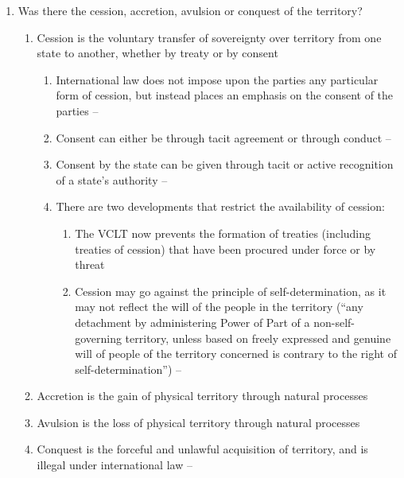\begin{enumerate}
\begin{enumerate}
\begin{enumerate}
        \end{enumerate}
    \end{enumerate}
    \item Was there the cession, accretion, avulsion or conquest of the territory?
    \begin{enumerate}
        \item Cession is the voluntary transfer of sovereignty over territory from one state to another, whether by treaty or by consent
        \begin{enumerate}
            \item International law does not impose upon the parties any particular form of cession, but instead places an emphasis on the consent of the parties -- 
            \item Consent can either be through tacit agreement or through conduct -- 
            \item Consent by the state can be given through tacit or active recognition of a state's authority -- 
            \item There are two developments that restrict the availability of cession:
            \begin{enumerate}
                \item The VCLT now prevents the formation of treaties (including treaties of cession) that have been procured under force or by threat
                \item Cession may go against the principle of self-determination, as it may not reflect the will of the people in the territory (``any detachment by administering Power of Part of a non-self-governing territory, unless based on freely expressed and genuine will of people of the territory concerned is contrary to the right of self-determination'') -- 
            \end{enumerate}
        \end{enumerate}
        \item Accretion is the gain of physical territory through natural processes
        \item Avulsion is the loss of physical territory through natural processes
        \item Conquest is the forceful and unlawful acquisition of territory, and is illegal under international law -- 

\end{enumerate}
\end{enumerate}
